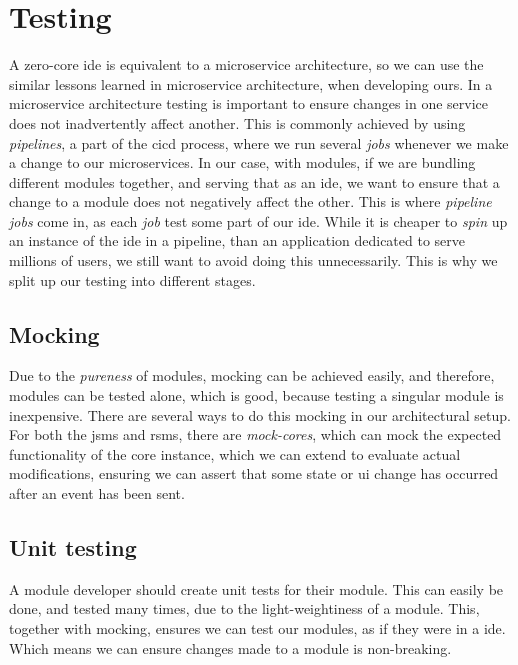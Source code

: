 \section{Testing} \label{sec:testing}

A zero-core \gls*{ide} is equivalent to a microservice architecture, so we can
use the similar lessons learned in microservice architecture, when developing
ours. In a microservice architecture testing is important to ensure changes in
one service does not inadvertently affect another. This is commonly achieved by
using \textit{pipelines}, a part of the \gls*{cicd} process, where we run
several \textit{jobs} whenever we make a change to our microservices. In our
case, with modules, if we are bundling different modules together, and serving
that as an \gls*{ide}, we want to ensure that a change to a module does not
negatively affect the other. This is where \textit{pipeline jobs} come in, as
each \textit{job} test some part of our \gls*{ide}. While it is cheaper to
\textit{spin} up an instance of the \gls*{ide} in a pipeline, than an
application dedicated to serve millions of users, we still want to avoid doing
this unnecessarily. This is why we split up our testing into different stages.


\subsection{Mocking}

Due to the \textit{pureness} of modules, mocking can be achieved easily, and
therefore, modules can be tested alone, which is good, because testing a
singular module is inexpensive. There are several ways to do this mocking in our
architectural setup. For both the \gls*{jsms} and \gls*{rsms}, there are
\textit{mock-cores}, which can mock the expected functionality of the core
instance, which we can extend to evaluate actual modifications, ensuring we can
assert that some state or \gls*{ui} change has occurred after an event has been
sent.


\subsection{Unit testing}

A module developer should create unit tests for their module. This can easily be
done, and tested many times, due to the light-weightiness of a module. This,
together with mocking, ensures we can test our modules, as if they were in a
\gls*{ide}. Which means we can ensure changes made to a module is non-breaking.

